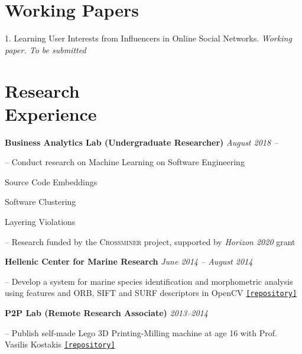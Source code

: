 \documentclass[margin, 10pt]{res}
\begin{document}
\begin{resume}
\section{Working Papers}

\begin{compactitem}

\item[1.] Learning User Interests from Influencers in Online Social Networks. \emph{Working paper. To be submitted}

\end{compactitem}

\section{Research \\ Experience}

\textbf{Business Analytics Lab (Undergraduate Researcher)} \hfill \emph{August 2018 --}
\begin{compactitem}
\item[--] Conduct research on Machine Learning on Software Engineering
\begin{compactitem}
\item Source Code Embeddings
\item Software Clustering
\item Layering Violations
\end{compactitem}
\item[--] Research funded by the \textsc{Crossminer} project, supported by \emph{Horizon 2020} grant
\end{compactitem}

\textbf{Hellenic Center for Marine Research} \hfill \emph{June 2014 -- August 2014}
\begin{compactitem}
\item[--] Develop a system for marine species identification and morphometric analysis using features and ORB, SIFT and SURF descriptors in OpenCV \href{https://github.com/papachristoumarios/triton-fpr}{\nolinkurl{[repository]}}
\end{compactitem}



\textbf{P2P Lab (Remote Research Associate)} \hfill \emph{2013--2014}

\begin{compactitem}

\item[--] Publish self-made Lego 3D Printing-Milling machine at age 16 with Prof. Vasilis Kostakis \href{https://github.com/papachristoumarios/lego-mindstorms-3d-printing-milling-machine}{\nolinkurl{[repository]}}
\end{compactitem}


\end{resume}
\end{document}
